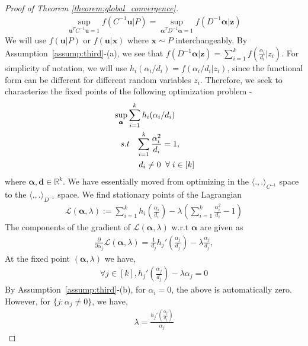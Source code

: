 \documentclass[letterpaper]{article}
\newcommand{\ba}[1]{\begin{align}#1\end{align}}
\newcommand{\bu}{\pmb{u}}
\newcommand{\balpha}{\pmb{\alpha}}
\newcommand{\bx}{\pmb{x}}
\newcommand{\bz}{\pmb{z}}
\newcommand{\bb}[1]{\left(#1\right)}
\newcommand{\sgn}{\text{sgn}}
\begin{document}
\begin{proof}[Proof of Theorem \ref{theorem:global_convergence}]
\begin{align*}
    \sup_{\bu^TC^{-1}\bu=1}f\bb{C^{-1}\bu|P} = 
\sup_{\balpha^TD^{-1}\balpha=1}f\bb{D^{-1}\balpha|\bz}
\end{align*}
We will use $f(\bu|P)$ or $f(\bu|\bx)$ where $\bx\sim P$ interchangeably. By Assumption~\ref{assump:third}-(a), we see that $f\bb{D^{-1}\balpha|\bz}=\sum_{i=1}^{k} f\bb{\frac{\alpha_i}{d_i}|z_i}$. For simplicity of notation, we will use $h_i(\alpha_i/d_i)=f\bb{\alpha_i/d_i|z_i}$, since the functional form can be different for different random variables $z_i$. 
Therefore, we seek to characterize the fixed points of the following optimization problem -
\begin{align}
    &\sup_{\balpha}\sum_{i=1}^{k} h_i(\alpha_i/d_i) \label{original_optimization_problem} \\
    &\;\;\; s.t \;\;\; \sum_{i=1}^{k}\frac{\alpha_{i}^{2}}{d_{i}} = 1, \notag \\
    &\;\;\;\;\;\;\;\;\;\;\; d_{i} \neq 0 \;\; \forall \; i \in [k] \notag
\end{align}
where $\balpha, \bm{d} \in \mathbb{R}^{k}$. We have essentially moved from optimizing in the $\langle .,.\rangle_{C^{-1}}$ space to the $\langle .,.\rangle_{D^{-1}}$ space. We find stationary points of the Lagrangian
\begin{align}
\mathcal{L}(\balpha, \lambda) := \sum_{i=1}^{k}h_i\bb{\frac{\alpha_i}{d_i}} - \lambda\left(\sum_{i=1}^{k}\frac{\alpha_{i}^{2}}{d_{i}} - 1\right) \label{eq:surface}
\end{align}
The components of the gradient of $\mathcal{L}(\balpha, \lambda)$ w.r.t $\balpha$ are given as 
\begin{align*}
    \frac{\partial}{\partial \alpha_j} \mathcal{L}(\balpha, \lambda) =\frac{1}{d_j}h_j'\left(\frac{\alpha_j}{d_j}\right)-\lambda \frac{\alpha_j}{d_j},
\end{align*}
At the fixed point $(\balpha, \lambda)$ we have, 
\begin{align*}
    \forall j \in [k], h_j'\left(\frac{\alpha_j}{d_j}\right)-\lambda\alpha_j = 0
\end{align*}
By Assumption~\ref{assump:third}-(b), for $\alpha_i=0$, the above is automatically zero. However, for $\{j:\alpha_j\neq 0\}$, we have, 
\begin{align}
    \lambda=%
    \frac{h_j'\left(\frac{\alpha_j}{d_j}\right)}{\alpha_j} \label{lagrange_condition1}

\end{align}
\end{proof}
\end{document}
